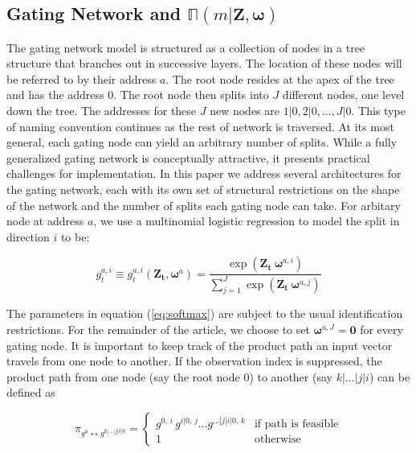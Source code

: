 \documentclass[12pt]{article}
\newcommand{\gateprod}[2]{\pi_{#1 \longleftrightarrow #2}}
\newcommand{\expmixwt}[0]{\mathbb{\Pi}}
\begin{document}
\subsection{Gating Network and $\expmixwt(m | \boldsymbol{Z}, \boldsymbol{\omega})$} \label{subsec:GatingNetwork}

The gating network model is structured as a collection of nodes in a tree
structure that branches out in successive layers. The location of these nodes will
be referred to by their address $a$. The root node resides at the apex of the tree
and has the address $0$. The root node then splits into $J$ different nodes,
one level down the tree. The addresses for these $J$ new nodes are 
$1|0, 2|0, ..., J|0$. This type of naming convention continues as the
rest of network is traversed. At its most general, each gating node can yield an
arbitrary number of splits. While a fully generalized gating network is
conceptually attractive, it presents practical challenges for implementation.
In this paper we address several architectures for the gating network, each
with its own set of structural restrictions on the shape of the network and
the number of splits each gating node can take. For arbitary node at address $a$,
we use a multinomial logistic regression to model the split in direction $i$ to be:

\begin{equation} \label{eq:softmax}
  g^{a,i}_{t} \equiv g^{a,i}_{t}(\boldsymbol{Z_{t}}, \boldsymbol{\omega}^{a}) = \frac{\exp(\boldsymbol{Z_{t}} \ \boldsymbol{\omega}^{a,i})}{\sum^{J}_{j=1} {\exp(\boldsymbol{Z_{t}} \ \boldsymbol{\omega}^{a,j})}}
\end{equation}

The parameters in equation (\ref{eq:softmax}) are subject to the usual
identification restrictions. For the remainder of the article, we choose
to set $\boldsymbol{\omega}^{a,J} = \boldsymbol{0}$ for every gating node.
It is important to keep track of the product path an input vector travels from
one node to another. If the observation index is suppressed, the product path
from one node (say the root node $0$) to another (say $k|\ldots|j|i$)
can be defined as

\begin{equation} \label{eq:gpath}
  \gateprod{g^{0}}{g^{k|\ldots|j|i|0}} =
    \begin{cases} 
       g^{0, \, i} \, g^{i|0, \, j} \ldots g^{\dots|j|i|0, \, k} & \textrm{if path is feasible} \\
       1 & \textrm{otherwise}
    \end{cases}
\end{equation}
\end{document}
